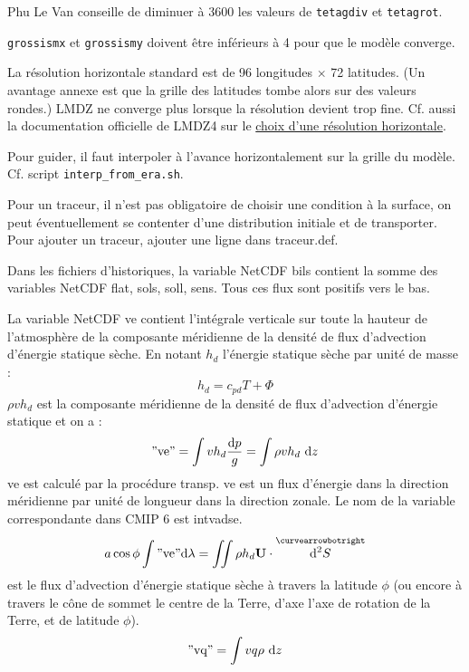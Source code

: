\documentclass[a4paper,english,french]{article}
\newcommand{\ud}{\mathrm{d}}
\newcommand{\pseudov}[1]{\overset{\curvearrowbotright}{#1}}
\begin{document}
Phu Le Van conseille de diminuer à 3600 les valeurs de \verb+tetagdiv+
et \verb+tetagrot+.

\verb+grossismx+ et \verb+grossismy+ doivent être inférieurs à 4 pour
que le modèle converge.

La résolution horizontale standard est de 96 longitudes $\times$ 72
latitudes. (Un avantage annexe est que la grille des latitudes tombe
alors sur des valeurs rondes.) LMDZ ne converge plus lorsque la
résolution devient trop fine. Cf. aussi la documentation officielle de
LMDZ4 sur le
\href{http://www.lmd.jussieu.fr/~lmdz/LMDZ4/choisir_une_resolution.html}{choix
  d'une résolution horizontale}.

Pour guider, il  faut interpoler à l'avance horizontalement sur la
grille du modèle. Cf. script \verb+interp_from_era.sh+.

Pour un traceur, il n'est pas obligatoire de choisir une condition à
la surface, on peut éventuellement se contenter d'une distribution
initiale et de transporter. Pour ajouter un traceur, ajouter une ligne
dans traceur.def.

Dans les fichiers d'historiques, la variable NetCDF bils contient la
somme des variables NetCDF flat, sols, soll, sens. Tous ces flux sont
positifs vers le bas.

La variable NetCDF ve contient l'intégrale verticale sur toute la
hauteur de l'atmosphère de la composante méridienne de la densité de
flux d'advection d'énergie statique sèche. En notant $h_d$ l'énergie
statique sèche par unité de masse :
\begin{equation*}
  h_d = c_{pd} T + \Phi
\end{equation*}
$\rho v h_d$ est la composante méridienne de la densité de flux
d'advection d'énergie statique et on a :
\begin{equation*}
  \mathrm{"ve"} = \int v h_d \frac{\ud p}{g} = \int \rho v h_d\ \ud z
\end{equation*}
ve est calculé par la procédure transp. ve est un flux d'énergie dans
la direction méridienne par unité de longueur dans la direction
zonale. Le nom de la variable correspondante dans CMIP 6 est intvadse.
\begin{equation*}
  a \cos \phi \int \mathrm{"ve"} \ud \lambda
  = \iint \rho h_d \mathbf{U} \cdot \pseudov{\ud^2 S}
\end{equation*}
est le flux d'advection d'énergie statique sèche à travers la latitude
$\phi$ (ou encore à travers le cône de sommet le centre de la Terre,
d'axe l'axe de rotation de la Terre, et de latitude $\phi$).
\begin{equation*}
  \mathrm{"vq"} = \int v q \rho\ \ud z
\end{equation*}
\end{document}
